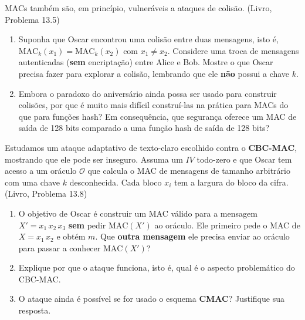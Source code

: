 \documentclass[11pt,a4paper]{article}
\newcommand{\livro}[1]{{\footnotesize\color{black!50}(Livro, Problema #1)}}
\begin{document}
\begin{exercicio}
MACs tamb\'{e}m s\~{a}o, em princ\'{i}pio, vulner\'{a}veis a ataques de colis\~{a}o. \livro{13.5}
\begin{enumerate}[label=(\alph*)]
    \item Suponha que Oscar encontrou uma colis\~{a}o entre duas mensagens, isto \'{e}, $\text{MAC}_k(x_1) = \text{MAC}_k(x_2)$ com $x_1 \neq x_2$. Considere uma troca de mensagens autenticadas (\textbf{sem} encripta\c{c}\~{a}o) entre Alice e Bob. Mostre o que Oscar precisa fazer para explorar a colis\~{a}o, lembrando que ele \textbf{n\~{a}o} possui a chave $k$.
    \item Embora o paradoxo do anivers\'{a}rio ainda possa ser usado para construir colis\~{o}es, por que \'{e} muito mais dif\'{i}cil constru\'{i}-las na pr\'{a}tica para MACs do que para fun\c{c}\~{o}es hash? Em consequ\^{e}ncia, que seguran\c{c}a oferece um MAC de sa\'{i}da de 128 bits comparado a uma fun\c{c}\~{a}o hash de sa\'{i}da de 128 bits?
\end{enumerate}
\end{exercicio}

\begin{exercicio}
Estudamos um ataque adaptativo de texto-claro escolhido contra o \textbf{CBC-MAC}, mostrando que ele pode ser inseguro. Assuma um $IV$ todo-zero e que Oscar tem acesso a um or\'{a}culo $\mathcal{O}$ que calcula o MAC de mensagens de tamanho arbitr\'{a}rio com uma chave $k$ desconhecida. Cada bloco $x_i$ tem a largura do bloco da cifra. \livro{13.8}
\begin{enumerate}[label=(\alph*)]
    \item O objetivo de Oscar \'{e} construir um MAC v\'{a}lido para a mensagem $X' = x_1\,x_2\,x_3$ \textbf{sem} pedir $\text{MAC}(X')$ ao or\'{a}culo. Ele primeiro pede o MAC de $X = x_1\,x_2$ e obt\'{e}m $m$. Que \textbf{outra mensagem} ele precisa enviar ao or\'{a}culo para passar a conhecer $\text{MAC}(X')$?
    \item Explique por que o ataque funciona, isto \'{e}, qual \'{e} o aspecto problem\'{a}tico do CBC-MAC.
    \item O ataque ainda \'{e} poss\'{i}vel se for usado o esquema \textbf{CMAC}? Justifique sua resposta.
\end{enumerate}
\end{exercicio}
\end{document}
